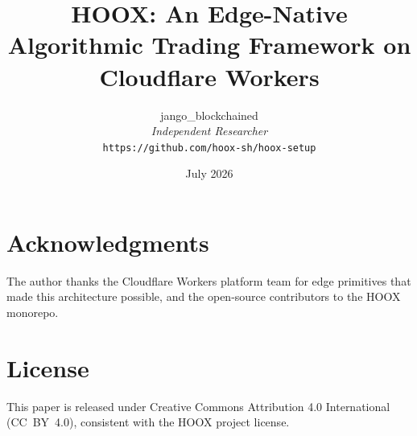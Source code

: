 \documentclass[10pt,a4paper]{article}
\title{\textbf{HOOX: An Edge-Native Algorithmic Trading Framework on Cloudflare Workers}}
\author{
  jango\_blockchained \\
  \small\textit{Independent Researcher} \\
  \small\texttt{https://github.com/hoox-sh/hoox-setup}
}
\date{July 2026}
\begin{document}
\maketitle




















\section*{Acknowledgments}

The author thanks the Cloudflare Workers platform team for edge primitives that made this architecture possible, and the open-source contributors to the \textsc{HOOX} monorepo.

\section*{License}

This paper is released under Creative Commons Attribution 4.0 International (CC~BY~4.0), consistent with the \textsc{HOOX} project license.




\appendix







\end{document}
